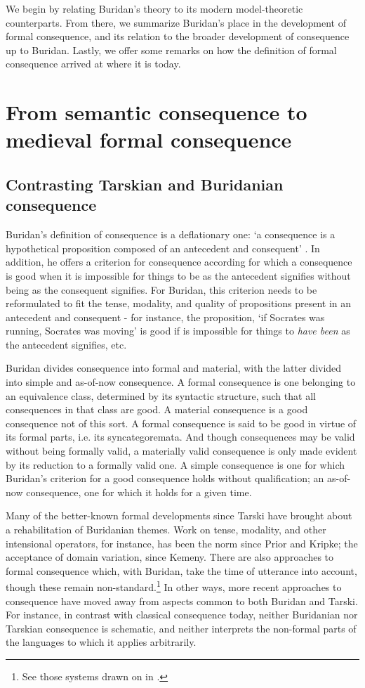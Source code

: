 We begin by relating Buridan's theory to its modern model-theoretic counterparts. From there, we summarize{\tiny } Buridan's place in the development of formal consequence, and its relation to the broader development of consequence up to Buridan. Lastly, we offer some remarks on how the definition of formal consequence arrived at where it is today.
\section[From semantic to formal consequence]{From semantic consequence to medieval formal consequence}
\subsection{Contrasting Tarskian and Buridanian consequence}
Buridan's definition of consequence is a deflationary one: `a consequence is a hypothetical proposition composed of an antecedent and consequent' \cite[I.3]{BuridanTC}. In addition, he offers a criterion for consequence according for which a consequence is good when it is impossible for things to be as the antecedent signifies without being as the consequent signifies. For Buridan, this criterion needs to be reformulated to fit the tense, modality, and quality of propositions present in an antecedent and consequent - for instance, the proposition, `if Socrates was running, Socrates was moving' is good if is impossible for things to \textit{have been} as the antecedent signifies, etc. 

Buridan divides consequence into formal and material, with the latter divided into simple and as-of-now consequence. A formal consequence is one belonging to an equivalence class, determined by its syntactic structure, such that all consequences in that class are good. A material consequence is a good consequence not of this sort. A formal consequence is said to be good in virtue of its formal parts, i.e. its syncategoremata. And though consequences may be valid without being formally valid, a materially valid consequence is only made evident by its reduction to a formally valid one. A simple consequence is one for which Buridan's criterion for a good consequence holds without qualification; an as-of-now consequence, one for which it holds for a given time.

Many of the better-known formal developments since Tarski have brought about a rehabilitation of Buridanian themes. Work on tense, modality, and other intensional operators, for instance, has been the norm since Prior and Kripke; the acceptance of domain variation, since Kemeny. There are also approaches to formal consequence which, with Buridan, take the time of utterance into account, though these remain non-standard.\footnote{See those systems drawn on in \cite{DutilhNovaes2005,DutilhNovaes2007b}.} In other ways, more recent approaches to consequence have moved away from aspects common to both Buridan and Tarski. For instance, in contrast with classical consequence today, neither Buridanian nor Tarskian consequence is schematic, and neither interprets the non-formal parts of the languages to which it applies arbitrarily.

